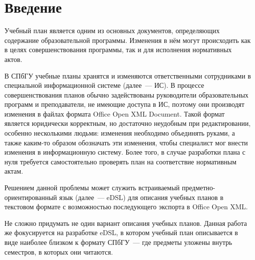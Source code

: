 
\section*{Введение}
\thispagestyle{withCompileDate}

Учебный план является одним из основных документов, определяющих содержание образовательной программы.
Изменения в нём могут происходить как в целях совершенствования программы, так и для исполнения нормативных актов.

В СПбГУ учебные планы хранятся и изменяются ответственными сотрудниками в специальной информационной системе (далее~--- ИС).
В процессе совершенствования планов обычно задействованы руководители образовательных программ и преподаватели, не имеющие доступа в ИС, поэтому они производят изменения в файлах формата Office Open XML Document.
Такой формат является юридически корректным, но достаточно неудобным при редактировании, особенно несколькими людьми: изменения необходимо объединять руками, а также каким-то образом обозначать эти изменения, чтобы специалист мог внести изменения в информационную систему.
Более того, в случае разработки плана с нуля требуется самостоятельно проверять план на соответствие нормативным актам.

Решением данной проблемы может служить встраиваемый предметно-ориентированный язык (далее~--- eDSL) для описания учебных планов в текстовом формате с возможностью последующего экспорта в Office Open XML.

Не сложно придумать не один вариант описания учебных планов.
Данная работа же фокусируется на разработке eDSL, в котором учебный план описывается в виде наиболее близком к формату СПбГУ~--- где предметы уложены внутрь семестров, в которых они читаются.
